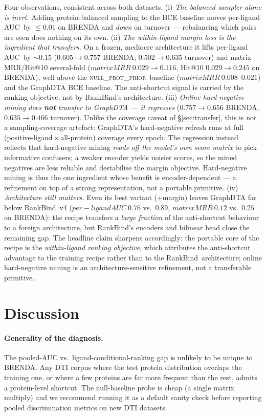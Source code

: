 \documentclass[11pt,a4paper]{article}
\newcommand{\method}{RankBind\xspace}
\newcommand{\nullprior}{\textsc{null\_prot\_prior}\xspace}
\newcommand{\plauc}{per-ligand AUC}
\newcommand{\matmrr}{matrix MRR}
\begin{document}
Four observations, consistent across both datasets. (i) \emph{The
balanced sampler alone is inert.} Adding protein-balanced sampling to
the BCE baseline moves \plauc\ by $\le 0.01$ on BRENDA and
\emph{down} on turnover --- rebalancing which pairs are seen does
nothing on its own. (ii) \emph{The within-ligand margin loss is the
ingredient that transfers.} On a frozen, mediocre architecture it lifts
\plauc\ by $\sim\!0.15$ ($0.605\!\to\!0.757$ BRENDA;
$0.502\!\to\!0.635$ turnover) and \matmrr/Hit@10 several-fold
($\matmrr\ 0.029\!\to\!0.116$, Hit@10 $0.029\!\to\!0.245$ on BRENDA),
well above the \nullprior\ baseline ($\matmrr\ 0.008$--$0.021$) and the
GraphDTA BCE baseline. The anti-shortcut signal is carried by the
ranking objective, not by \method's architecture. (iii) \emph{Online
hard-negative mining does \textbf{not} transfer to GraphDTA --- it
regresses} ($0.757\!\to\!0.656$ BRENDA, $0.635\!\to\!0.466$ turnover).
Unlike the coverage caveat of \S\ref{sec:transfer}, this is not a
sampling-coverage artefact: GraphDTA's hard-negative refresh runs at
full (positive-ligand\,$\times$\,all-protein) coverage every epoch.
The regression instead reflects that hard-negative mining \emph{reads
off the model's own score matrix} to pick informative confusers; a
weaker encoder yields noisier scores, so the mined negatives are less
reliable and destabilise the margin objective. Hard-negative mining is
thus the one ingredient whose benefit is encoder-dependent --- a
refinement on top of a strong representation, not a portable primitive.
(iv) \emph{Architecture still matters.} Even its best variant
($+$margin) leaves GraphDTA far below \method\ v4 ($\plauc\ 0.76$ vs.\
$0.89$, $\matmrr\ 0.12$ vs.\ $0.25$ on BRENDA): the recipe transfers a
\emph{large fraction} of the anti-shortcut behaviour to a foreign
architecture, but \method's encoders and bilinear head close the
remaining gap. The headline claim sharpens accordingly: the portable
core of the recipe is the \emph{within-ligand ranking objective}, which
attributes the anti-shortcut advantage to the training recipe rather
than to the \method\ architecture; online hard-negative mining is an
architecture-sensitive refinement, not a transferable primitive.

\section{Discussion}
\label{sec:discussion}

\paragraph{Generality of the diagnosis.}
The pooled-AUC vs.\ ligand-conditional-ranking gap is unlikely to be unique to
BRENDA. Any DTI corpus where the test protein distribution overlaps the
training one, or where a few proteins are far more frequent than the rest,
admits a protein-level shortcut. The null-baseline probe is cheap (a single
matrix multiply) and we recommend running it as a default sanity check before
reporting pooled discrimination metrics on new DTI datasets.
\end{document}
